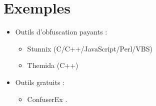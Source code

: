 \documentclass{article}
\begin{document}
\vspace{1cm}

\section{Exemples}

\begin{itemize}
    \item Outils d'obfuscation payants :
    \begin{itemize}
        \item Stunnix (C/C++/JavaScript/Perl/VBS) \href{http://stunnix.com/}{\faExternalLink}
        \item Themida (C++) \href{https://www.oreans.com/themida.php}{\faExternalLink}
    \end{itemize}
    \item Outils gratuits :
    \begin{itemize}
        \item ConfuserEx \href{https://yck1509.github.io/ConfuserEx/}{\faExternalLink}.
    \end{itemize}
\end{itemize}

\newpage

\printbibliography[title=Réferences externes]
\end{document}
